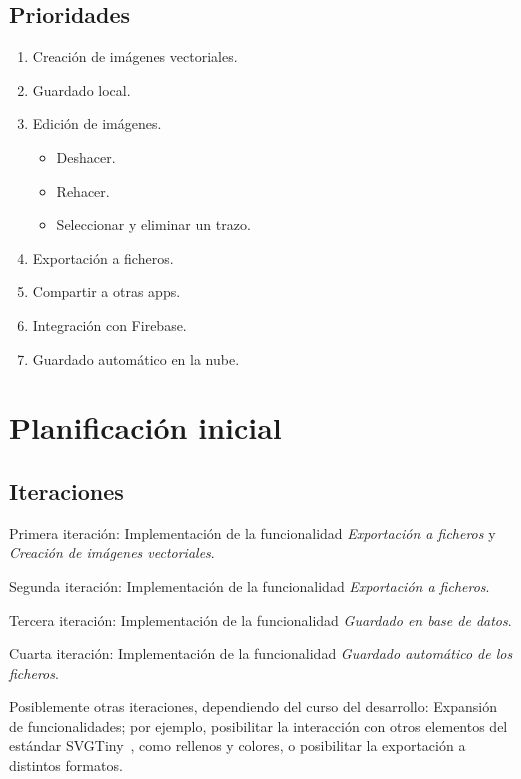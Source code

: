 \documentclass[a4paper,openright,12pt]{article}
\begin{document}
\subsection{Prioridades}
\begin{enumerate}
    \item Creación de imágenes vectoriales.
    \item Guardado local.
    \item Edición de imágenes.
    \begin{itemize}
        \item Deshacer.
        \item Rehacer.
        \item Seleccionar y eliminar un trazo.
    \end{itemize}
    \item Exportación a ficheros.
    \item Compartir a otras apps.
    \item Integración con Firebase.
    \item Guardado automático en la nube.
\end{enumerate}



\section{Planificación inicial}

\subsection{Iteraciones}\label{iteraciones}
Primera iteración: Implementación de la funcionalidad \emph{Exportación a ficheros} y \emph{Creación de imágenes vectoriales}.

Segunda iteración: Implementación de la funcionalidad \emph{Exportación a ficheros}.

Tercera iteración: Implementación de la funcionalidad \emph{Guardado en base de datos}.

Cuarta iteración: Implementación de la funcionalidad \emph{Guardado automático de los ficheros}.

Posiblemente otras iteraciones, dependiendo del curso del desarrollo: Expansión de funcionalidades; por ejemplo, posibilitar la interacción con otros elementos del estándar SVGTiny~\cite{SVGTiny}, como rellenos y colores, o posibilitar la exportación a distintos formatos.


\end{document}
